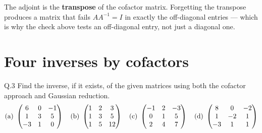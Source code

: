 \begin{pitfall}
The adjoint is the \textbf{transpose} of the cofactor matrix. Forgetting the
transpose produces a matrix that fails $AA^{-1}=I$ in exactly the off-diagonal
entries --- which is why the check above tests an off-diagonal entry, not just
a diagonal one.
\end{pitfall}

\section{Four inverses by cofactors}

\begin{question}{Q.3}
Find the inverse, if it exists, of the given matrices using both the cofactor
approach and Gaussian reduction.
\[
\text{(a) }\begin{pmatrix}6&0&-1\\1&3&5\\-3&1&0\end{pmatrix}\quad
\text{(b) }\begin{pmatrix}1&2&3\\1&3&5\\1&5&12\end{pmatrix}\quad
\text{(c) }\begin{pmatrix}-1&2&-3\\0&1&5\\2&4&7\end{pmatrix}\quad
\text{(d) }\begin{pmatrix}8&0&-2\\1&-2&1\\-3&1&1\end{pmatrix}
\]
\end{question}

